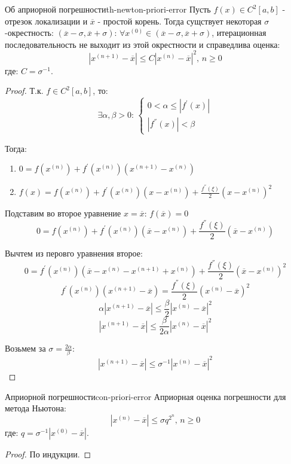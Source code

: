 \documentclass[14pt]{extarticle}
\begin{document}
    \begin{theorem}{Об априорной погрешности}{th-newton-priori-error}
        Пусть $f(x) \in C^{2}[a, b]$ - отрезок локализации и $\overline{x}$ - простой корень. Тогда сущствует некоторая $\sigma$-окрестность: $(\overline{x} - \sigma, \overline{x} + \sigma)$: $\forall x^{(0)} \in (\overline{x} - \sigma, \overline{x} + \sigma)$, итерационная последовательность не выходит из этой окрестности и справедлива оценка:
        $$|x^{(n + 1)} - \overline{x}| \leq C|x^{(n)} - \overline{x}|^{2} \text{, } n \geq 0$$
        где: $C = \sigma^{-1}$.

        \begin{proof}
            Т.к. $f \in C^{2}[a, b]$, то: 
            $$\exists \alpha, \beta > 0 \text{: } \begin{cases} 0 < \alpha \leq |f^{'}(x)| \\ |f^{''}(x)| < \beta \end{cases}$$

            Тогда:
            \begin{enumerate}
                \item $0 = f(x^{(n)}) + f^{'}(x^{(n)})(x^{(n + 1)} - x^{(n)})$
                \item $f(x) = f(x^{(n)}) + f^{'}(x^{(n)})(x - x^{(n)}) + \frac{f^{''}(\xi)}{2}(x - x^{(n)})^{2}$
            \end{enumerate}

            Подставим во второе уравнение $x = \overline{x}$: $f(\overline{x}) = 0$
            $$0 = f(x^{(n)}) + f^{'}(x^{(n)})(\overline{x} - x^{(n)}) + \frac{f^{''}(\xi)}{2}(\overline{x} - x^{(n)})$$

            Вычтем из перовго уравнения второе:
            $$0 = f^{'}(x^{(n)})(\overline{x} - x^{(n)} - x^{(n + 1)} + x^{(n)}) + \frac{f^{''}(\xi)}{2}(\overline{x} - x^{(n)})^{2}$$
            $$f^{'}(x^{(n)})(x^{(n + 1)} - \overline{x}) = \frac{f^{''}(\xi)}{2}(x^{(n)} - \overline{x})^{2}$$
            $$\alpha |x^{(n + 1)} - \overline{x}| \leq \frac{\beta}{2}|x^{(n)} - \overline{x}|^{2}$$
            $$|x^{(n + 1)} - \overline{x}| \leq \frac{\beta}{2\alpha}|x^{(n)} - \overline{x}|^{2}$$

            Возьмем за $\sigma = \frac{2\alpha}{\beta}$:
            $$|x^{(n + 1)} - \overline{x}| \leq \sigma^{-1} |x^{(n)} - \overline{x}|^{2}$$
        \end{proof}
    \end{theorem}

    \begin{consequence}{Априорной погрешности}{con-priori-error}
        Априорная оценка погрешности для метода Ньютона:
        $$|x^{(n)} - \overline{x}| \leq \sigma q^{2^{n}} \text{, } n \geq 0$$
        где: $q = \sigma^{-1}|x^{(0)} - \overline{x}|$.
    
        \begin{proof}
            По индукции.
        \end{proof}
    \end{consequence}
\end{document}
